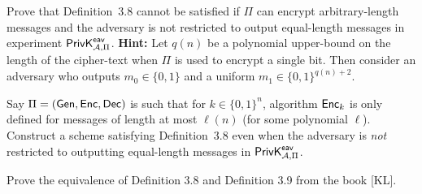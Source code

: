 \documentclass[a4paper,10pt,landscape,twocolumn]{scrartcl}
\begin{document}
\begin{exercise}
Prove that Definition~3.8 cannot be
  satisfied if $\Pi$ can encrypt arbitrary-length messages and the
  adversary is not restricted to output equal-length messages in
  experiment $\mathsf{PrivK}^{\mathsf{eav}}_{\mathcal{A},\Pi}$. \textbf{ Hint:} Let $q(n)$
  be a polynomial upper-bound on the length of the cipher-text when
  $\Pi$ is used to encrypt a single bit. Then consider an adversary
  who outputs $m_0 \in \{0, 1\}$ and a uniform $m_1 \in \{0, 1\}^{q(n)+2}$.
\end{exercise}

\begin{exercise}
Say $\Pi=\left( \mathsf{Gen},\mathsf{Enc},\mathsf{Dec} \right)$ is such that for $k\in \{0,1\}^n$, algorithm $\mathsf{Enc}_k$ is only defined for messages of length at most $\ell(n)$ (for some polynomial $\ell$). Construct a scheme satisfying Definition~3.8 even when the adversary is \emph{not} restricted to outputting equal-length messages in $\mathsf{PrivK}^{\mathsf{eav}}_{\mathcal{A},\Pi}$. 

  
\end{exercise}

\begin{exercise}
Prove the equivalence of Definition 3.8 and Definition 3.9 from the book [KL].
\end{exercise}
  
\end{document}
